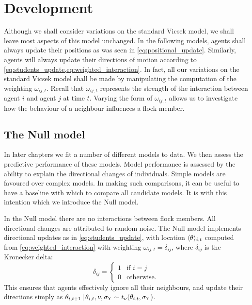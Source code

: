 \section{Development}

Although we shall consider variations on the standard Vicsek model, we shall
leave most aspects of this model unchanged. In the following models, agents
shall always update their positions as was seen in \cref{eq:positional_update}.
Similarly, agents will always update their directions of motion according to
\cref{eq:students_update,eq:weighted_interaction}. In fact, all our variations
on the standard Vicsek model shall be made by manipulating the computation of
the weighting $\omega_{ij,t}$. Recall that $\omega_{ij,t}$ represents the
strength of the interaction between agent $i$ and agent $j$ at time $t$.
Varying the form of $\omega_{ij,t}$ allows us to investigate how the behaviour
of a neighbour influences a flock member.

\subsection{The Null model}
\label{sec:null_model}

In later chapters we fit a number of different models to data. We
then assess the predictive performance of these models. Model
performance is assessed by the ability to explain the directional changes
of individuals. Simple models are favoured over complex models. In making
such comparisons, it can be useful to have a baseline with which to compare all
candidate models. It is with this intention which we introduce the Null model.

In the Null model there are no interactions between flock members. All
directional changes are attributed to random noise. The Null model implements
directional updates as in \cref{eq:students_update}, with location
$\langle\theta\rangle_{i,t}$ computed from \cref{eq:weighted_interaction} with
weighting $\omega_{ij,t}=\delta_{ij}$, where $\delta_{ij}$ is the Kronecker
delta:
\begin{equation*}
  \delta_{ij} =
  \begin{cases}
    1 & \text{if } i=j \\
    0 & \text{otherwise.}
  \end{cases}
\end{equation*}
This ensures that agents effectively ignore all their neighbours, and update
their directions simply as $\theta_{i,t+1} \,|\, \theta_{i,t}, \nu, \sigma_Y
\sim t_\nu(\theta_{i,t}, \sigma_Y)$.

